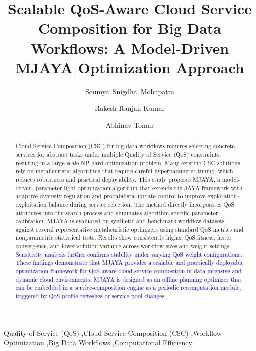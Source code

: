 \documentclass[3p,twocolumn]{elsarticle}
\theoremstyle{thmstyleone}%
\theoremstyle{thmstyletwo}%
\theoremstyle{thmstylethree}%
\begin{document}
 
 \begin{frontmatter}
 
 
 \title{Scalable QoS-Aware Cloud Service Composition for Big Data Workflows: A Model-Driven MJAYA Optimization Approach}
 
 
\author[1]{Soumya~Snigdha~Mohapatra} 
\address[1]{Department of Information Technology, Pillai College of Engineering, Mahatma Education Society, New Panvel, Navi Mumbai, 410206, India}

\author[2]{Rakesh Ranjan Kumar}
\address[2]{Department of Computer Science and Engineering, C V Raman Global University, Bhubaneswar, 752054, India}

\author[3]{Abhinav Tomar}
\address[3]{Department of Computer Science and Engineering, Netaji Subhas University of Technology, New Delhi, 110078, India}

 
 \begin{abstract}
 
Cloud Service Composition (CSC) for big data workflows requires selecting concrete services for abstract tasks under multiple Quality of Service (QoS) constraints, resulting in a large-scale NP-hard optimization problem. Many existing CSC solutions rely on metaheuristic algorithms that require careful hyperparameter tuning, which reduces robustness and practical deployability. This study proposes MJAYA, a model-driven, parameter-light optimization algorithm that extends the JAYA framework with adaptive diversity regulation and probabilistic update control to improve exploration–exploitation balance during service selection. The method directly incorporates QoS attributes into the search process and eliminates algorithm-specific parameter calibration. MJAYA is evaluated on synthetic and benchmark workflow datasets against several representative metaheuristic optimizers using standard QoS metrics and nonparametric statistical tests. Results show consistently higher QoS fitness, faster convergence, and lower solution variance across workflow sizes and weight settings. \textcolor{blue}{Sensitivity analysis further confirms stability under varying QoS weight configurations. These findings demonstrate that MJAYA provides a scalable and practically deployable 
optimization framework for QoS-aware cloud service composition in data-intensive and dynamic cloud environments. MJAYA is designed as an offline planning optimizer that can be embedded in a 
service-composition engine as a periodic recomputation module, triggered by QoS profile refreshes or service pool changes.}
 
 \end{abstract}
 \begin{keyword}
Quality of Service (QoS) \sep Cloud Service Composition (CSC) \sep Workflow Optimization \sep Big Data Workflows \sep Computational Efficiency\end{keyword}
 
 \end{frontmatter}
 
\end{document}
